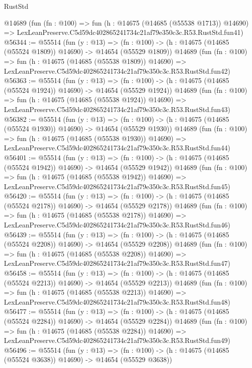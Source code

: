 \begin{lexlean}{RustStd}
\begin{coremodule}
    @14689
    (fun (fn : @100) =>
    fun (h : @14675 (@14685 (@55538 @1713)) @14690) =>
    LexLeanPreserve.C5d59dc402865241734c21af79e350c3c.R53.RustStd.fun41)
@56344 := @55514
    (fun (y : @13) =>
    (fn : @100) -> (h : @14675 (@14685 (@55524 @1809)) @14690) -> @14654 (@55529 @1809))
    @14689
    (fun (fn : @100) =>
    fun (h : @14675 (@14685 (@55538 @1809)) @14690) =>
    LexLeanPreserve.C5d59dc402865241734c21af79e350c3c.R53.RustStd.fun42)
@56363 := @55514
    (fun (y : @13) =>
    (fn : @100) -> (h : @14675 (@14685 (@55524 @1924)) @14690) -> @14654 (@55529 @1924))
    @14689
    (fun (fn : @100) =>
    fun (h : @14675 (@14685 (@55538 @1924)) @14690) =>
    LexLeanPreserve.C5d59dc402865241734c21af79e350c3c.R53.RustStd.fun43)
@56382 := @55514
    (fun (y : @13) =>
    (fn : @100) -> (h : @14675 (@14685 (@55524 @1930)) @14690) -> @14654 (@55529 @1930))
    @14689
    (fun (fn : @100) =>
    fun (h : @14675 (@14685 (@55538 @1930)) @14690) =>
    LexLeanPreserve.C5d59dc402865241734c21af79e350c3c.R53.RustStd.fun44)
@56401 := @55514
    (fun (y : @13) =>
    (fn : @100) -> (h : @14675 (@14685 (@55524 @1942)) @14690) -> @14654 (@55529 @1942))
    @14689
    (fun (fn : @100) =>
    fun (h : @14675 (@14685 (@55538 @1942)) @14690) =>
    LexLeanPreserve.C5d59dc402865241734c21af79e350c3c.R53.RustStd.fun45)
@56420 := @55514
    (fun (y : @13) =>
    (fn : @100) -> (h : @14675 (@14685 (@55524 @2178)) @14690) -> @14654 (@55529 @2178))
    @14689
    (fun (fn : @100) =>
    fun (h : @14675 (@14685 (@55538 @2178)) @14690) =>
    LexLeanPreserve.C5d59dc402865241734c21af79e350c3c.R53.RustStd.fun46)
@56439 := @55514
    (fun (y : @13) =>
    (fn : @100) -> (h : @14675 (@14685 (@55524 @2208)) @14690) -> @14654 (@55529 @2208))
    @14689
    (fun (fn : @100) =>
    fun (h : @14675 (@14685 (@55538 @2208)) @14690) =>
    LexLeanPreserve.C5d59dc402865241734c21af79e350c3c.R53.RustStd.fun47)
@56458 := @55514
    (fun (y : @13) =>
    (fn : @100) -> (h : @14675 (@14685 (@55524 @2213)) @14690) -> @14654 (@55529 @2213))
    @14689
    (fun (fn : @100) =>
    fun (h : @14675 (@14685 (@55538 @2213)) @14690) =>
    LexLeanPreserve.C5d59dc402865241734c21af79e350c3c.R53.RustStd.fun48)
@56477 := @55514
    (fun (y : @13) =>
    (fn : @100) -> (h : @14675 (@14685 (@55524 @2284)) @14690) -> @14654 (@55529 @2284))
    @14689
    (fun (fn : @100) =>
    fun (h : @14675 (@14685 (@55538 @2284)) @14690) =>
    LexLeanPreserve.C5d59dc402865241734c21af79e350c3c.R53.RustStd.fun49)
@56496 := @55514
    (fun (y : @13) =>
    (fn : @100) -> (h : @14675 (@14685 (@55524 @3638)) @14690) -> @14654 (@55529 @3638))

\end{coremodule}
\end{lexlean}
